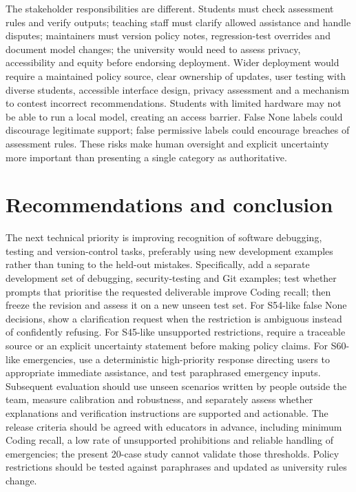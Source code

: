 \documentclass[11pt,a4paper]{article}
\begin{document}
The stakeholder responsibilities are different. Students must check assessment rules and verify outputs; teaching staff must clarify allowed assistance and handle disputes; maintainers must version policy notes, regression-test overrides and document model changes; the university would need to assess privacy, accessibility and equity before endorsing deployment. Wider deployment would require a maintained policy source, clear ownership of updates, user testing with diverse students, accessible interface design, privacy assessment and a mechanism to contest incorrect recommendations. Students with limited hardware may not be able to run a local model, creating an access barrier. False None labels could discourage legitimate support; false permissive labels could encourage breaches of assessment rules. These risks make human oversight and explicit uncertainty more important than presenting a single category as authoritative.

\section{Recommendations and conclusion}
The next technical priority is improving recognition of software debugging, testing and version-control tasks, preferably using new development examples rather than tuning to the held-out mistakes. Specifically, add a separate development set of debugging, security-testing and Git examples; test whether prompts that prioritise the requested deliverable improve Coding recall; then freeze the revision and assess it on a new unseen test set. For S54-like false None decisions, show a clarification request when the restriction is ambiguous instead of confidently refusing. For S45-like unsupported restrictions, require a traceable source or an explicit uncertainty statement before making policy claims. For S60-like emergencies, use a deterministic high-priority response directing users to appropriate immediate assistance, and test paraphrased emergency inputs. Subsequent evaluation should use unseen scenarios written by people outside the team, measure calibration and robustness, and separately assess whether explanations and verification instructions are supported and actionable. The release criteria should be agreed with educators in advance, including minimum Coding recall, a low rate of unsupported prohibitions and reliable handling of emergencies; the present 20-case study cannot validate those thresholds. Policy restrictions should be tested against paraphrases and updated as university rules change.
\end{document}
